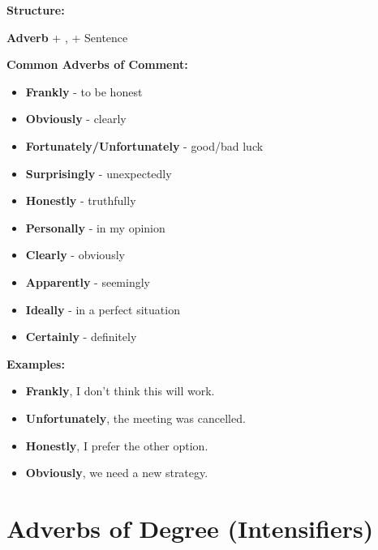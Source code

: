 \begin{grammarbox}[title=Adverbs of Comment and Viewpoint]
\textbf{Structure:}
\begin{center}
\Large \textbf{Adverb} + , + Sentence
\end{center}

\textbf{Common Adverbs of Comment:}
\begin{itemize}
    \item \textbf{Frankly} - to be honest 
    \item \textbf{Obviously} - clearly 
    \item \textbf{Fortunately/Unfortunately} - good/bad luck 
    \item \textbf{Surprisingly} - unexpectedly 
    \item \textbf{Honestly} - truthfully 
    \item \textbf{Personally} - in my opinion 
    \item \textbf{Clearly} - obviously 
    \item \textbf{Apparently} - seemingly 
    \item \textbf{Ideally} - in a perfect situation 
    \item \textbf{Certainly} - definitely 
\end{itemize}

\textbf{Examples:}
\begin{itemize}
    \item \textbf{Frankly}, I don't think this will work. 
    \item \textbf{Unfortunately}, the meeting was cancelled. 
    \item \textbf{Honestly}, I prefer the other option. 
    \item \textbf{Obviously}, we need a new strategy. 
\end{itemize}
\end{grammarbox}

\section{Adverbs of Degree (Intensifiers)}

